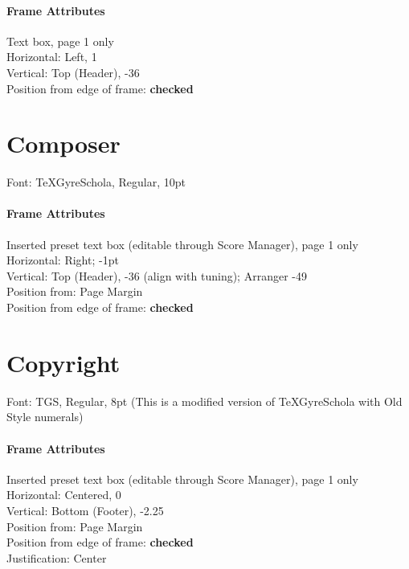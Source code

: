 \documentclass[]{memoir}
\begin{document}
\paragraph{Frame Attributes}
\label{sec:frame-attributes-1}

Text box, page 1 only\\
Horizontal: Left, 1\\
Vertical: Top (Header), -36\\
Position from edge of frame: \textbf{checked}

\section{Composer}
\label{sec:composer}

Font: TeXGyreSchola, Regular, 10pt\\

\paragraph{Frame Attributes}
\label{sec:frame-attributes-2}

Inserted preset text box (editable through Score Manager), page 1 only\\
Horizontal: Right; -1pt\\
Vertical: Top (Header), -36 (align with tuning); Arranger -49\\
Position from: Page Margin\\
Position from edge of frame: \textbf{checked}\\

\section{Copyright}
\label{sec:copyright}

Font: TGS, Regular, 8pt (This is a modified version of TeXGyreSchola with Old Style numerals)

\paragraph{Frame Attributes}
\label{sec:frame-attributes-3}

Inserted preset text box (editable through Score Manager), page 1 only\\
Horizontal: Centered, 0\\
Vertical: Bottom (Footer), -2.25\\
Position from: Page Margin\\
Position from edge of frame: \textbf{checked}\\
Justification: Center
\end{document}
